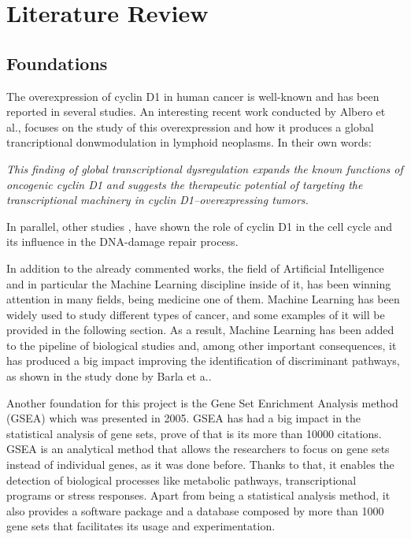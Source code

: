 
\section{Literature Review}
\subsection{Foundations}

The overexpression of cyclin D1 in human cancer is well-known\cite{Lamb2003} and has been reported in several studies\cite{2017Reena}.
An interesting recent work conducted by Albero et al.\cite{10.1172/JCI96520}, focuses on the study of this overexpression and how it produces a global trancriptional donwmodulation in lymphoid neoplasms. In their own words:

\textit{This finding of global transcriptional dysregulation expands the known functions of oncogenic cyclin D1 and suggests the therapeutic potential of targeting the transcriptional machinery in cyclin D1–overexpressing tumors.}
\cite{10.1172/JCI96520}

In parallel, other studies \cite{DiSante2017} \cite{Casimiro2016}, have shown the role of cyclin D1 in the cell cycle and its influence in the DNA-damage repair process.

In addition to the already commented works, the field of Artificial Intelligence and in particular the Machine Learning discipline inside of it, has been winning attention in many fields, being medicine one of them.
Machine Learning has been widely used to study different types of cancer, and some examples of it will be provided in the following section.
As a result, Machine Learning has been added to the pipeline of biological studies and, among other important consequences, it has produced a big impact improving the identification of discriminant pathways, as shown in the study done by Barla et a.\cite{Barla2014}.

Another foundation for this project is the Gene Set Enrichment Analysis method (GSEA) \cite{Subramanian15545} which was presented in 2005.
GSEA has had a big impact in the statistical analysis of gene sets, prove of that is its more than 10000 citations.
GSEA is an analytical method that allows the researchers to focus on gene sets instead of individual genes, as it was done before.
Thanks to that, it enables the detection of biological processes like metabolic pathways, transcriptional programs or stress responses. 
Apart from being a statistical analysis method, it also provides a software package and a database composed by more than 1000 gene sets that facilitates its usage and experimentation.

